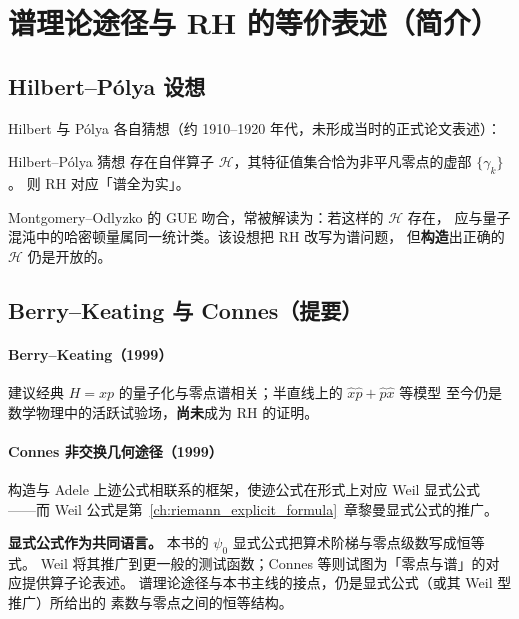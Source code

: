 \section{谱理论途径与 RH 的等价表述（简介）}

\subsection{Hilbert--Pólya 设想}

Hilbert 与 Pólya 各自猜想（约 1910--1920 年代，未形成当时的正式论文表述）：

\begin{definition}{Hilbert--Pólya 猜想}{}
存在自伴算子 $\mathcal{H}$，其特征值集合恰为非平凡零点的虚部 $\{\gamma_k\}$。
则 RH 对应「谱全为实」。
\end{definition}

Montgomery--Odlyzko 的 GUE 吻合，常被解读为：若这样的 $\mathcal{H}$ 存在，
应与量子混沌中的哈密顿量属同一统计类。该设想把 RH 改写为谱问题，
但\textbf{构造}出正确的 $\mathcal{H}$ 仍是开放的。

\subsection{Berry--Keating 与 Connes（提要）}

\paragraph{Berry--Keating（1999）}
建议经典 $H=xp$ 的量子化与零点谱相关；半直线上的 $\hat x\hat p+\hat p\hat x$ 等模型
至今仍是数学物理中的活跃试验场，\textbf{尚未}成为 RH 的证明。

\paragraph{Connes 非交换几何途径（1999）}
构造与 Adele 上迹公式相联系的框架，使迹公式在形式上对应 Weil 显式公式
——而 Weil 公式是第~\ref{ch:riemann_explicit_formula}~章黎曼显式公式的推广。
\begin{explainframe}
\noindent\textbf{显式公式作为共同语言。}
本书的 $\psi_0$ 显式公式把算术阶梯与零点级数写成恒等式。
Weil 将其推广到更一般的测试函数；Connes 等则试图为「零点与谱」的对应提供算子论表述。
谱理论途径与本书主线的接点，仍是显式公式（或其 Weil 型推广）所给出的
素数与零点之间的恒等结构。
\end{explainframe}

